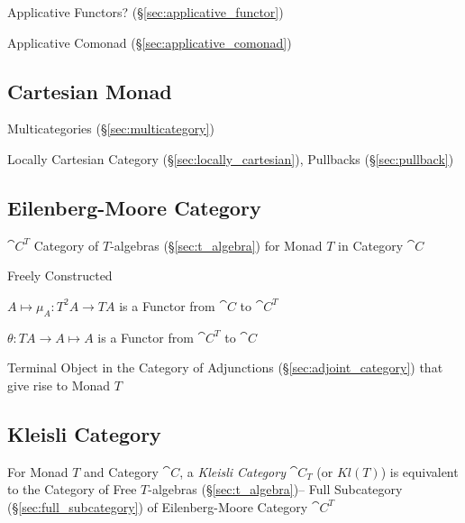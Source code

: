 Applicative Functors? (\S\ref{sec:applicative_functor})

Applicative Comonad (\S\ref{sec:applicative_comonad})



\subsection{Cartesian Monad}\label{sec:cartesian_monad}

Multicategories (\S\ref{sec:multicategory})

Locally Cartesian Category (\S\ref{sec:locally_cartesian}), Pullbacks
(\S\ref{sec:pullback})



\subsection{Eilenberg-Moore Category}\label{sec:eilenberg_moore}

$\cat{C}^T$ Category of $T$-algebras (\S\ref{sec:t_algebra}) for
Monad $T$ in Category $\cat{C}$

Freely Constructed

$A \mapsto \mu_A : T^2 A \rightarrow T A$ is a Functor from
$\cat{C}$ to $\cat{C}^T$

$\theta : T A \rightarrow A \mapsto A$ is a Functor from
$\cat{C}^T$ to $\cat{C}$

Terminal Object in the Category of Adjunctions
(\S\ref{sec:adjoint_category}) that give rise to Monad $T$



\subsection{Kleisli Category}\label{sec:kleisli_category}

For Monad $T$ and Category $\cat{C}$, a \emph{Kleisli Category}
$\cat{C}_T$ (or $Kl(T)$) is equivalent to the Category of Free
$T$-algebras (\S\ref{sec:t_algebra})-- Full Subcategory
(\S\ref{sec:full_subcategory}) of Eilenberg-Moore Category
$\cat{C}^T$

